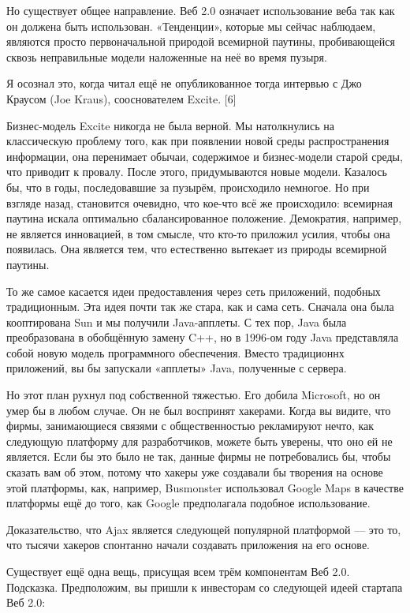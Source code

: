 \documentclass[ebook,12pt,oneside,openany]{memoir}
\begin{document}
Но существует общее направление. Веб 2.0 означает использование веба
так как он должена быть использован. «Тенденции», которые мы сейчас
наблюдаем, являются просто первоначальной природой всемирной паутины,
пробивающейся сквозь неправильные модели наложенные на неё во время
пузыря.

Я осознал это, когда читал ещё не опубликованное тогда интервью с Джо
Краусом (Joe Kraus), сооснователем Excite. [6]

Бизнес-модель Excite никогда не была верной. Мы натолкнулись на
классическую проблему того, как при появлении новой среды
распространения информации, она перенимает обычаи, содержимое и
бизнес-модели старой среды, что приводит к провалу. После этого,
придумываются новые модели. Казалось бы, что в годы, последовавшие за
пузырём, происходило немногое. Но при взгляде назад, становится
очевидно, что кое-что всё же происходило: всемирная паутина искала
оптимально сбалансированное положение. Демократия, например, не
является инновацией, в том смысле, что кто-то приложил усилия, чтобы
она появилась. Она является тем, что естественно вытекает из природы
всемирной паутины.

То же самое касается идеи предоставления через сеть приложений,
подобных традиционным. Эта идея почти так же стара, как и сама сеть.
Сначала она была кооптирована Sun и мы получили Java-апплеты. С тех
пор, Java была преобразована в обобщённую замену C++, но в 1996-ом
году Java представляла собой новую модель программного обеспечения.
Вместо традиционнх приложений, вы бы запускали «апплеты» Java,
полученные с сервера.

Но этот план рухнул под собственной тяжестью. Его добила Microsoft, но
он умер бы в любом случае. Он не был воспринят хакерами. Когда вы
видите, что фирмы, занимающиеся связями с общественностью рекламируют
нечто, как следующую платформу для разработчиков, можете быть уверены,
что оно ей не является. Если бы это было не так, данные фирмы не
потребовались бы, чтобы сказать вам об этом, потому что хакеры уже
создавали бы творения на основе этой платформы, как, например,
Busmonster использовал Google Maps в качестве платформы ещё до того,
как Google предполагала подобное использование.

Доказательство, что Ajax является следующей популярной платформой —
это то, что тысячи хакеров спонтанно начали создавать приложения на
его основе.

Существует ещё одна вещь, присущая всем трём компонентам Веб 2.0.
Подсказка. Предположим, вы пришли к инвесторам со следующей идеей
стартапа Веб 2.0:
\end{document}
